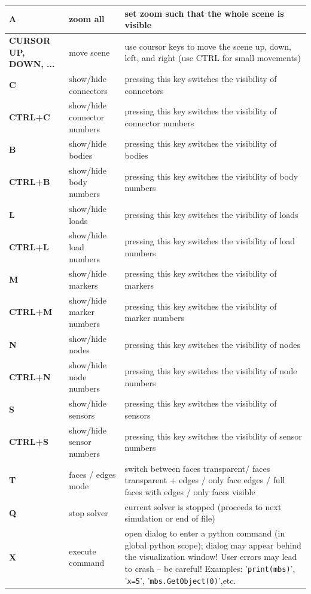 \begin{center}
\begin{longtable}{| p{4cm} | p{4cm} | p{8cm} |}
  \bf A & zoom all & set zoom such that the whole scene is visible \\ \hline
  \bf CURSOR UP, DOWN, ... & move scene& use coursor keys to move the scene up, down, left, and right (use CTRL for small movements)\\ \hline
  \bf C & show/hide connectors & pressing this key switches the visibility of connectors \\ \hline
  \bf CTRL+C & show/hide connector numbers & pressing this key switches the visibility of connector numbers \\ \hline
	\bf B & show/hide bodies & pressing this key switches the visibility of bodies \\ \hline
  \bf CTRL+B & show/hide body numbers & pressing this key switches the visibility of body numbers \\ \hline
	\bf L & show/hide loads & pressing this key switches the visibility of loads \\ \hline
  \bf CTRL+L & show/hide load numbers & pressing this key switches the visibility of load numbers \\ \hline
	\bf M & show/hide markers & pressing this key switches the visibility of markers \\ \hline
  \bf CTRL+M & show/hide marker numbers & pressing this key switches the visibility of marker numbers \\ \hline
	\bf N & show/hide nodes & pressing this key switches the visibility of nodes \\ \hline
  \bf CTRL+N & show/hide node numbers & pressing this key switches the visibility of node numbers \\ \hline
	\bf S & show/hide sensors & pressing this key switches the visibility of sensors \\ \hline
  \bf CTRL+S & show/hide sensor numbers & pressing this key switches the visibility of sensor numbers \\ \hline
	\bf T & faces / edges mode & switch between faces transparent/ faces transparent + edges / only face edges / full faces with edges / only faces visible \\ \hline
	\bf Q & stop solver & current solver is stopped (proceeds to next simulation or end of file) \\ \hline
	\bf X & execute command & open dialog to enter a python command (in global python scope); dialog may appear behind the visualization window! User errors may lead to crash -- be careful! 
	Examples: '\texttt{print(mbs)}', '\texttt{x=5}', '\texttt{mbs.GetObject(0)}',etc.\\ \hline

\end{longtable}
\end{center}
